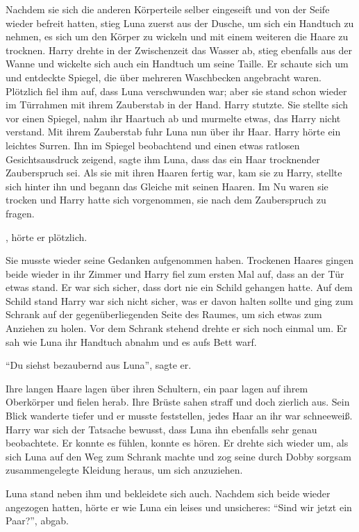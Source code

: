 Nachdem sie sich die anderen Körperteile selber eingeseift und von der Seife wieder befreit hatten, stieg Luna zuerst aus der Dusche, um sich ein Handtuch zu nehmen, es sich um den Körper zu wickeln und mit einem weiteren die Haare zu trocknen. Harry drehte in der Zwischenzeit das Wasser ab, stieg ebenfalls aus der Wanne und wickelte sich auch ein Handtuch um seine Taille. Er schaute sich um und entdeckte Spiegel, die über mehreren Waschbecken angebracht waren. Plötzlich fiel ihm auf, dass Luna verschwunden war; aber sie stand schon wieder im Türrahmen mit ihrem Zauberstab in der Hand. Harry stutzte. Sie stellte sich vor einen Spiegel, nahm ihr Haartuch ab und murmelte etwas, das Harry nicht verstand. Mit ihrem Zauberstab fuhr Luna nun über ihr Haar. Harry hörte ein leichtes Surren. Ihn im Spiegel beobachtend und einen etwas ratlosen Gesichtsausdruck zeigend, sagte ihm Luna, dass das ein Haar trocknender Zauberspruch sei. Als sie mit ihren Haaren fertig war, kam sie zu Harry, stellte sich hinter ihn und begann das Gleiche mit seinen Haaren. Im Nu waren sie trocken und Harry hatte sich vorgenommen, sie nach dem Zauberspruch zu fragen.

, hörte er plötzlich.

Sie musste wieder seine Gedanken aufgenommen haben. Trockenen Haares gingen beide wieder in ihr Zimmer und Harry fiel zum ersten Mal auf, dass an der Tür etwas stand. Er war sich sicher, dass dort nie ein Schild gehangen hatte. Auf dem Schild stand  Harry war sich nicht sicher, was er davon halten sollte und ging zum Schrank auf der gegenüberliegenden Seite des Raumes, um sich etwas zum Anziehen zu holen. Vor dem Schrank stehend drehte er sich noch einmal um. Er sah wie Luna ihr Handtuch abnahm und es aufs Bett warf.

\enquote{Du siehst bezaubernd aus Luna}, sagte er.

Ihre langen Haare lagen über ihren Schultern, ein paar lagen auf ihrem Oberkörper und fielen herab. Ihre Brüste sahen straff und doch zierlich aus. Sein Blick wanderte tiefer und er musste feststellen, jedes Haar an ihr war schneeweiß. Harry war sich der Tatsache bewusst, dass Luna ihn ebenfalls sehr genau beobachtete. Er konnte es fühlen, konnte es hören. Er drehte sich wieder um, als sich Luna auf den Weg zum Schrank machte und zog seine durch Dobby sorgsam zusammengelegte Kleidung heraus, um sich anzuziehen.

Luna stand neben ihm und bekleidete sich auch. Nachdem sich beide wieder angezogen hatten, hörte er wie Luna ein leises und unsicheres: \enquote{Sind wir jetzt ein Paar?}, abgab.

